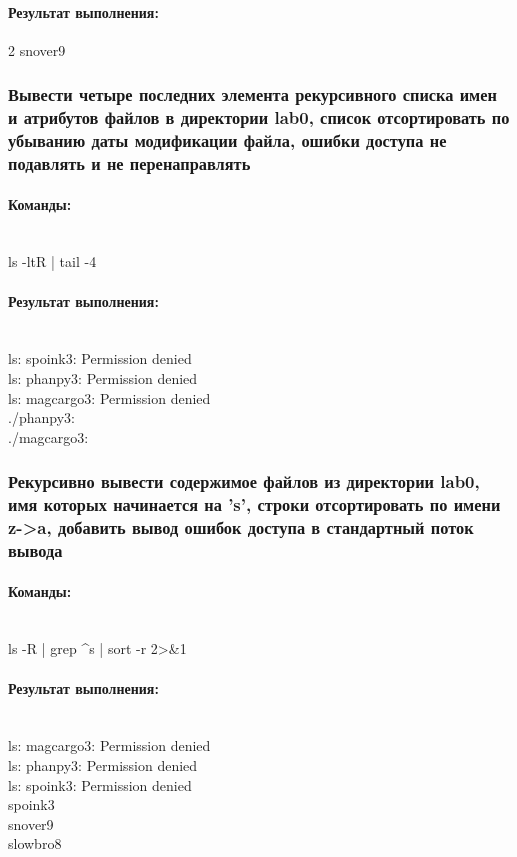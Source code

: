 \documentclass[12pt,onecolumn]{article}
\begin{document}
\paragraph{Результат выполнения:}
2 snover9
\subsubsection{Вывести четыре последних элемента рекурсивного списка имен и атрибутов файлов в директории lab0, список отсортировать по убыванию даты модификации файла, ошибки доступа не подавлять и не перенаправлять}
\paragraph{Команды:}\\
ls -ltR | tail -4

\paragraph{Результат выполнения: }
\hfill\\
ls: spoink3: Permission denied\\
ls: phanpy3: Permission denied\\
ls: magcargo3: Permission denied\\
./phanpy3:\\
./magcargo3:\\

\subsubsection{Рекурсивно вывести содержимое файлов из директории lab0, имя которых начинается на 's', строки отсортировать по имени z->a, добавить вывод ошибок доступа в стандартный поток вывода}
\paragraph{Команды:}\\
ls -R | grep \^ \large s | sort -r 2>\&1
\paragraph{Результат выполнения: }
\hfill\\
ls: magcargo3: Permission denied\\
ls: phanpy3: Permission denied\\
ls: spoink3: Permission denied\\
spoink3\\
snover9\\
slowbro8\\
\end{document}
